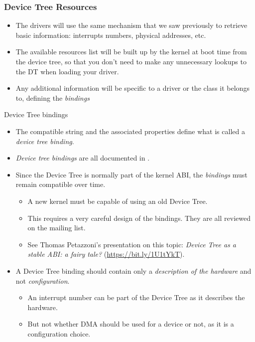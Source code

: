\begin{frame}
  \frametitle{Device Tree Resources}
  \begin{itemize}
  \item The drivers will use the same mechanism that we saw previously
    to retrieve basic information: interrupts numbers, physical
    addresses, etc.
  \item The available resources list will be built up by the kernel at
    boot time from the device tree, so that you don't need to make any
    unnecessary lookups to the DT when loading your driver.
  \item Any additional information will be specific to a driver or
    the class it belongs to, defining the {\em bindings}
  \end{itemize}
\end{frame}

\begin{frame}{Device Tree bindings}
  \begin{itemize}
  \item The compatible string and the associated properties define
    what is called a {\em device tree binding}.
  \item {\em Device tree bindings} are all documented in
    .
  \item Since the Device Tree is normally part of the kernel ABI, the
    {\em bindings} must remain compatible over time.
    \begin{itemize}
    \item A new kernel must be capable of using an old Device Tree.
    \item This requires a very careful design of the bindings. They
      are all reviewed on the 
      mailing list.
    \item See Thomas Petazzoni's presentation on this topic:
          {\em Device Tree as a stable ABI: a fairy tale?}
	  (\url{https://bit.ly/1U1tYkT}).
    \end{itemize}
  \item A Device Tree binding should contain only a {\em description
      of the hardware} and not {\em configuration}.
    \begin{itemize}
    \item An interrupt number can be part of the Device Tree as it
      describes the hardware.
    \item But not whether DMA should be used for a device or not,
      as it is a configuration choice.
    \end{itemize}
  \end{itemize}
\end{frame}

